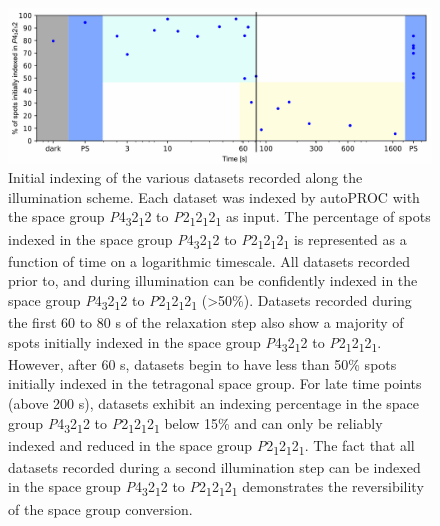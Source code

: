 \begin{figure}[H] %
    \centering
    \noindent \includegraphics[width=\textwidth]{images/LOV2/LOV2slow_Fig6.pdf}
    \hfill
    \caption{Initial indexing of the various datasets recorded along the illumination scheme. Each dataset was indexed by autoPROC with the space group \textit{P}4\textsubscript{3}2\textsubscript{1}2 to \textit{P}2\textsubscript{1}2\textsubscript{1}2\textsubscript{1} as input. The percentage of spots indexed in the space group \textit{P}4\textsubscript{3}2\textsubscript{1}2 to \textit{P}2\textsubscript{1}2\textsubscript{1}2\textsubscript{1} is represented as a function of time on a logarithmic timescale. All datasets recorded prior to, and during illumination can be confidently indexed in the space group \textit{P}4\textsubscript{3}2\textsubscript{1}2 to \textit{P}2\textsubscript{1}2\textsubscript{1}2\textsubscript{1} (>50\%). Datasets recorded during the first 60 to 80 s of the relaxation step also show a majority of spots initially indexed in the space group \textit{P}4\textsubscript{3}2\textsubscript{1}2 to \textit{P}2\textsubscript{1}2\textsubscript{1}2\textsubscript{1}. However, after 60 s, datasets begin to have less than 50\% spots initially indexed in the tetragonal space group. For late time points (above 200 s), datasets exhibit an indexing percentage in the space group \textit{P}4\textsubscript{3}2\textsubscript{1}2 to \textit{P}2\textsubscript{1}2\textsubscript{1}2\textsubscript{1} below 15\% and can only be reliably indexed and reduced in the space group \textit{P}2\textsubscript{1}2\textsubscript{1}2\textsubscript{1}. The fact that all datasets recorded during a second illumination step can be indexed in the space group \textit{P}4\textsubscript{3}2\textsubscript{1}2 to \textit{P}2\textsubscript{1}2\textsubscript{1}2\textsubscript{1} demonstrates the reversibility of the space group conversion.}
    \label{fig:LOV2slowindexP4}
\end{figure}

